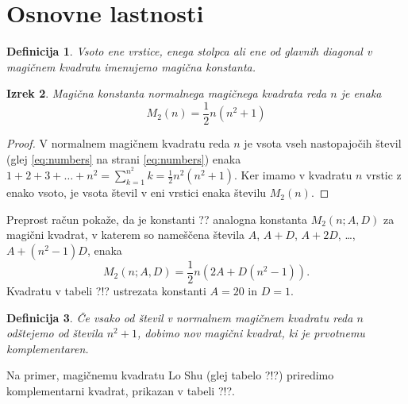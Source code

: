 \documentclass[a4paper,12pt]{article}
\newtheorem{izrek}{Izrek}[section]
\newtheorem{definicija}[izrek]{Definicija}
\newcommand{\m}{M_2}
\newcommand{\pojem}[1]{\emph{#1}}
\begin{document}
\section{Osnovne lastnosti}

\begin{definicija}
      Vsoto ene vrstice, enega stolpca ali ene od glavnih diagonal
      v magičnem kvadratu imenujemo \pojem{magična konstanta}.
\end{definicija}

   
   \begin{izrek}
      Magična konstanta normalnega magičnega kvadrata reda \(n\)
      je enaka
      \begin{equation}
         \m(n) = \frac{1}{2} n(n^2+1)
      \end{equation}
   \end{izrek}

   \begin{proof}
      V normalnem magičnem kvadratu reda $n$ je vsota vseh nastopajočih
      števil (glej \ref{eq:numbers} na strani \ref{eq:numbers}) enaka
      $1+2+3+\dots+n^2=\sum_{k=1}^{n^2}k=\frac{1}{2}n^2(n^2+1)$. Ker imamo
      v kvadratu $n$ vrstic z enako vsoto, je vsota števil v eni vrstici
      enaka številu $\m(n)$.
   \end{proof}

Preprost račun pokaže, da je konstanti ?? analogna konstanta
$\m(n;A,D)$ za magični kvadrat, v katerem so nameščena števila
$A$, $A+D$, $A+2D$, \dots, $A+(n^2-1)D$, enaka %
\[\m(n;A,D) = \frac{1}{2}n(2A + D(n^2-1)).\]
Kvadratu v tabeli ?!? ustrezata konstanti $A=20$ in $D=1$.

\begin{definicija}
      Če vsako od števil v normalnem magičnem kvadratu reda $n$ odštejemo
      od števila $n^2+1$, dobimo nov magični kvadrat, ki je prvotnemu
      \pojem{komplementaren}.
\end{definicija}

Na primer, magičnemu kvadratu Lo Shu (glej tabelo ?!?) priredimo
komplementarni kvadrat, prikazan v tabeli ?!?.
%
\end{document}
